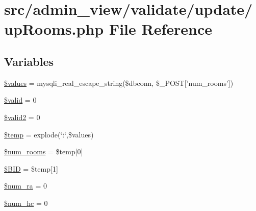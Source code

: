 \hypertarget{upRooms_8php}{\section{src/admin\-\_\-view/validate/update/up\-Rooms.php \-File \-Reference}
\label{upRooms_8php}
}
\subsection*{\-Variables}
\begin{DoxyCompactItemize}
\item 
\hyperlink{upRooms_8php_affc45c6ace2eeb3f300b054dbf9592b6}{\$values} = mysqli\-\_\-real\-\_\-escape\-\_\-string(\$dbconn, \$\-\_\-\-P\-O\-S\-T\mbox{[}'num\-\_\-rooms'\mbox{]})
\item 
\hyperlink{upRooms_8php_a0587674d27d00ef497e08e53ccf45bbb}{\$valid} = 0
\item 
\hyperlink{upRooms_8php_abe127179a308dc005af960bb7cd17739}{\$valid2} = 0
\item 
\hyperlink{upRooms_8php_a0d57fb0317e19ec798aa625381ebf342}{\$temp} = explode(\char`\"{}\-:\char`\"{},\$values)
\item 
\hyperlink{upRooms_8php_ad51cf907141b35051a8d4123b3e7e259}{\$num\-\_\-rooms} = \$temp\mbox{[}0\mbox{]}
\item 
\hyperlink{upRooms_8php_a7458cf5c1cfaeb93fe055362ecff999e}{\$\-B\-I\-D} = \$temp\mbox{[}1\mbox{]}
\item 
\hyperlink{upRooms_8php_aaf1cd7ce3153edff129df3a57ab81c2f}{\$num\-\_\-ra} = 0
\item 
\hyperlink{upRooms_8php_a0676c3aab4512e850c0778fdc42ea183}{\$num\-\_\-hc} = 0
\end{DoxyCompactItemize}


